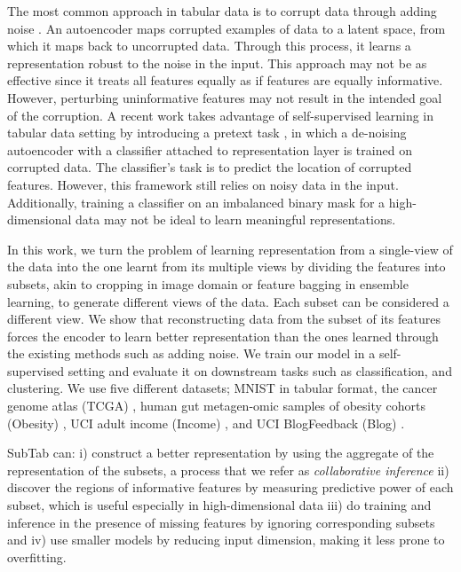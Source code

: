 The most common approach in tabular data is to corrupt data through adding noise \citep{vincent2008extracting}. An autoencoder maps corrupted examples of data to a latent space, from which it maps back to uncorrupted data. Through this process, it learns a representation robust to the noise in the input. This approach may not be as effective since it treats all features equally as if features are equally informative. However, perturbing uninformative features may not result in the intended goal of the corruption. A recent work takes advantage of self-supervised learning in tabular data setting by introducing a pretext task \citep{yoon2020vime}, in which a de-noising autoencoder with a classifier attached to representation layer is trained on corrupted data. The classifier's task is to predict the location of corrupted features. However, this framework still relies on noisy data in the input. Additionally, training a classifier on an imbalanced binary mask for a high-dimensional data may not be ideal to learn meaningful representations.

In this work, we turn the problem of learning representation from a single-view of the data into the one learnt from its multiple views by dividing the features into subsets, akin to cropping in image domain or feature bagging in ensemble learning, to generate different views of the data. Each subset can be considered a different view. We show that reconstructing data from the subset of its features forces the encoder to learn better representation than the ones learned through the existing methods such as adding noise. We train our model in a self-supervised setting and evaluate it on downstream tasks such as classification, and clustering. We use five different datasets; MNIST in tabular format, the cancer genome atlas (TCGA) \citep{tomczak2015cancer}, human gut metagen-omic samples of obesity cohorts (Obesity) \citep{oh2020deepmicro, le2013richness}, UCI adult income (Income) \citep{kohavi1996scaling}, and UCI BlogFeedback (Blog) \citep{buza2014feedback}.

SubTab can: i) construct a better representation by using the aggregate of the representation of the subsets, a process that we refer as \emph{collaborative inference} ii) discover the regions of informative features by measuring predictive power of each subset, which is useful especially in high-dimensional data iii) do training and inference in the presence of missing features by ignoring corresponding subsets and iv) use smaller models by reducing input dimension, making it less prone to overfitting.

